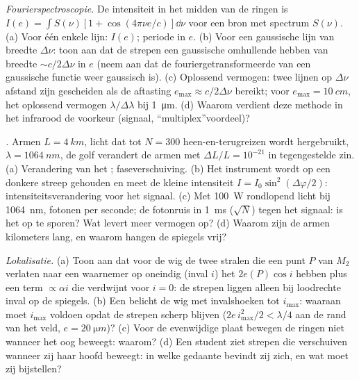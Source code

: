 \begin{exercise}[$\star\star\star$]\label{exo:b2:michelson:10}
\emph{Fourierspectroscopie.} De intensiteit in het midden van de ringen
is $I(e) = \int S(\nu)[1 + \cos(4\pi\nu e/c)]\dd\nu$ voor een bron met spectrum
$S(\nu)$. (a) Voor één enkele lijn: $I(e)$; periode in $e$. (b) Voor een gaussische
lijn van breedte $\Delta\nu$: toon aan dat de strepen een gaussische
omhullende hebben van
breedte $\sim c/2\Delta\nu$ in $e$ (neem aan dat de fouriergetransformeerde
van een gaussische functie
weer gaussisch is). (c) Oplossend vermogen: twee lijnen op $\Delta\nu$
afstand zijn gescheiden als
de aftasting $e_{\max} \approx c/2\Delta\nu$ bereikt; voor
$e_{\max} = \qty{10}{cm}$, het
oplossend vermogen $\lambda/\Delta\lambda$ bij \qty{1}{\micro m}. (d) Waarom
verdient deze methode
in het infrarood de voorkeur (signaal, ``multiplex''voordeel)?
\end{exercise}

\begin{exercise}[$\star\star\star$]\label{exo:b2:michelson:11}
\emph{.} Armen $L = \qty{4}{km}$, licht dat tot
$N = 300$ heen-en-terugreizen wordt hergebruikt, $\lambda = \qty{1064}{nm}$,
de golf verandert de armen met
$\Delta L/L = 10^{-21}$ in tegengestelde zin. (a) Verandering van het ;
faseverschuiving. (b) Het instrument wordt op een donkere streep gehouden en meet
de kleine intensiteit $I = I_0\sin^2(\Delta\varphi/2)$:
intensiteitsverandering voor het
signaal. (c) Met \qty{100}{W} rondlopend licht bij \qty{1064}{nm}, fotonen
per seconde; de fotonruis in \qty{1}{ms} ($\sqrt N$) tegen het signaal:
is het op te sporen? Wat levert meer vermogen op? (d) Waarom zijn de armen
kilometers lang, en waarom hangen de spiegels vrij?
\end{exercise}

\begin{exercise}[$\star\star\star$]\label{exo:b2:michelson:12}
\emph{Lokalisatie.} (a) Toon aan dat voor de wig de twee stralen die een
punt $P$ van $M_2$ verlaten naar een waarnemer op oneindig (inval $i$) het
 $2e(P)\cos i$ hebben plus een term $\propto\alpha i$ die verdwijnt voor
$i = 0$: de strepen liggen alleen bij loodrechte inval op de spiegels. (b)
Een  belicht de wig met invalshoeken tot
$i_{\max}$: waaraan moet $i_{\max}$ voldoen opdat de strepen scherp blijven
($2e\,i_{\max}^2/2 < \lambda/4$ aan de rand van het veld,
$e = \qty{20}{\micro m}$)? (c)
Voor de evenwijdige plaat bewegen de ringen niet wanneer het oog beweegt:
waarom? (d) Een student ziet strepen die verschuiven wanneer zij haar hoofd beweegt:
in welke gedaante bevindt zij zich, en wat moet zij bijstellen?
\end{exercise}

